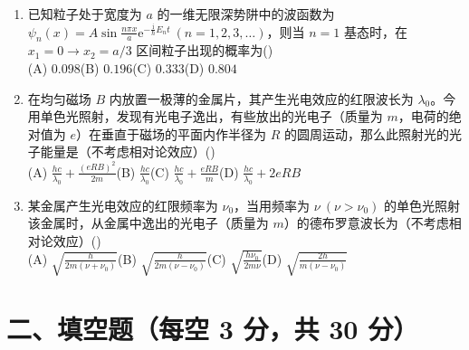 \documentclass[zihao=5,a4paper,UTF8]{ctexart}
\newcommand{\ee}{\mathrm{e}}
\newcommand{\choicebox}{\hfill(\hspace{1.8em})}
\begin{document}
\begin{enumerate}[leftmargin=2em, itemsep=6pt]
    \item 已知粒子处于宽度为 $a$ 的一维无限深势阱中的波函数为 $\psi_n(x) = A\sin\frac{n\pi x}{a}\ee^{-\frac{\mathrm{i}}{\hbar}E_n t}\ (n=1,2,3,\dots)$，则当 $n=1$ 基态时，在 $x_1=0 \to x_2=a/3$ 区间粒子出现的概率为\choicebox\\
    (A) $0.098$\qquad (B) $0.196$\qquad (C) $0.333$\qquad (D) $0.804$

    \item 在均匀磁场 $B$ 内放置一极薄的金属片，其产生光电效应的红限波长为 $\lambda_0$。今用单色光照射，发现有光电子逸出，有些放出的光电子（质量为 $m$，电荷的绝对值为 $e$）在垂直于磁场的平面内作半径为 $R$ 的圆周运动，那么此照射光的光子能量是（不考虑相对论效应）\choicebox\\
    (A) $\frac{hc}{\lambda_0} + \frac{(eRB)^2}{2m}$\qquad (B) $\frac{hc}{\lambda_0}$\qquad (C) $\frac{hc}{\lambda_0} + \frac{eRB}{m}$\qquad (D) $\frac{hc}{\lambda_0} + 2eRB$

    \item 某金属产生光电效应的红限频率为 $\nu_0$，当用频率为 $\nu\ (\nu > \nu_0)$ 的单色光照射该金属时，从金属中逸出的光电子（质量为 $m$）的德布罗意波长为（不考虑相对论效应）\choicebox\\
    (A) $\sqrt{\frac{h}{2m(\nu+\nu_0)}}$\qquad (B) $\sqrt{\frac{h}{2m(\nu-\nu_0)}}$\qquad (C) $\sqrt{\frac{h\nu_0}{2m\nu}}$\qquad (D) $\sqrt{\frac{2h}{m(\nu-\nu_0)}}$
\end{enumerate}

\section*{二、填空题（每空 3 分，共 30 分）}
\end{document}

